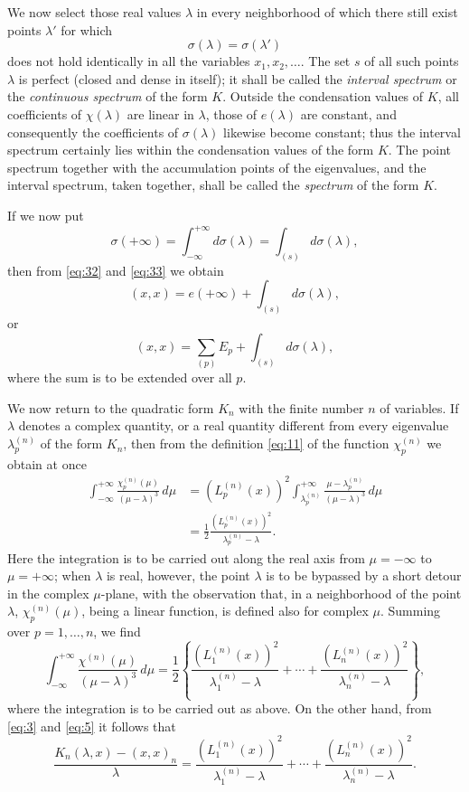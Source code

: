 \documentclass[b5paper,twoside]{article}
\newcommand{\originalpage}[1]{\phantomsection\label{origpage:#1}}
\begin{document}
We now select those real values $\lambda$ in every neighborhood of which
there still exist points $\lambda'$ for which
\[
  \sigma(\lambda)=\sigma(\lambda')
\]
does not hold identically in all the variables $x_1,x_2,\ldots$. The set $s$
of all such points $\lambda$ is perfect (closed and dense in itself); it shall
be called the \emph{interval spectrum} or the \emph{continuous spectrum} of
the form $K$.  Outside the condensation values of $K$, all coefficients of
$\chi(\lambda)$ are linear in $\lambda$, those of $e(\lambda)$ are constant,
and consequently the coefficients of $\sigma(\lambda)$ likewise become
constant; thus the interval spectrum certainly lies within the condensation
values of the form $K$.  The point spectrum together with the accumulation
points of the eigenvalues, and the interval spectrum, taken together, shall
be called the \emph{spectrum} of the form $K$.

If we now put
\[
  \sigma(+\infty)
  =\int_{-\infty}^{+\infty}d\sigma(\lambda)
  =\int_{(s)}d\sigma(\lambda),
\]
\originalpage{173}then from \eqref{eq:32} and \eqref{eq:33} we obtain
\[
  (x,x)=e(+\infty)+\int_{(s)}d\sigma(\lambda),
\]
or
\begin{equation}
\tag{34}\label{eq:34}
  (x,x)=\sum_{(p)}E_p+\int_{(s)}d\sigma(\lambda),
\end{equation}
where the sum is to be extended over all $p$.

We now return to the quadratic form $K_n$ with the finite number $n$ of
variables.  If $\lambda$ denotes a complex quantity, or a real quantity
different from every eigenvalue $\lambda_p^{(n)}$ of the form $K_n$, then
from the definition \eqref{eq:11} of the function $\chi_p^{(n)}$ we obtain at
once
\[
\begin{aligned}
  \int_{-\infty}^{+\infty}
    \frac{\chi_p^{(n)}(\mu)}{(\mu-\lambda)^3}\,d\mu
  &=(L_p^{(n)}(x))^2
    \int_{\lambda_p^{(n)}}^{+\infty}
    \frac{\mu-\lambda_p^{(n)}}{(\mu-\lambda)^3}\,d\mu\\
  &=\frac12\frac{(L_p^{(n)}(x))^2}{\lambda_p^{(n)}-\lambda}.
\end{aligned}
\]
Here the integration is to be carried out along the real axis from
$\mu=-\infty$ to $\mu=+\infty$; when $\lambda$ is real, however, the point
$\lambda$ is to be bypassed by a short detour in the complex $\mu$-plane,
with the observation that, in a neighborhood of the point $\lambda$,
$\chi_p^{(n)}(\mu)$, being a linear function, is defined also for complex
$\mu$.  Summing over $p=1,\ldots,n$, we find
\begin{equation}
\tag{35}\label{eq:35}
  \int_{-\infty}^{+\infty}
    \frac{\chi^{(n)}(\mu)}{(\mu-\lambda)^3}\,d\mu
  =\frac12\left\{
    \frac{(L_1^{(n)}(x))^2}{\lambda_1^{(n)}-\lambda}
    +\cdots+
    \frac{(L_n^{(n)}(x))^2}{\lambda_n^{(n)}-\lambda}
  \right\},
\end{equation}
where the integration is to be carried out as above.  On the other hand,
from \eqref{eq:3} and \eqref{eq:5} it follows that
\begin{equation}
\tag{36}\label{eq:36}
  \frac{K_n(\lambda,x)-(x,x)_n}{\lambda}
  =\frac{(L_1^{(n)}(x))^2}{\lambda_1^{(n)}-\lambda}
   +\cdots+
   \frac{(L_n^{(n)}(x))^2}{\lambda_n^{(n)}-\lambda}.
\end{equation}
\end{document}
